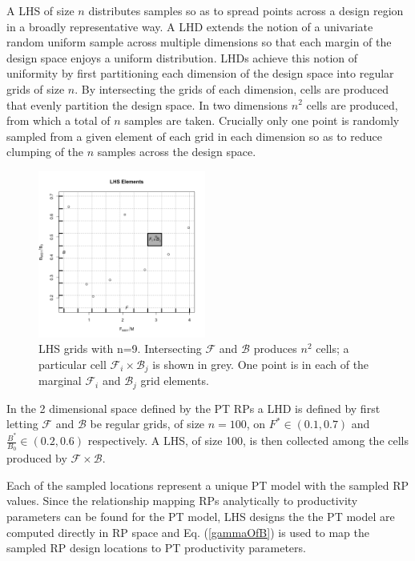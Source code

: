 A LHS of size $n$ distributes samples so as to spread points across a design 
region in a broadly representative way. A LHD extends the notion of a 
univariate random uniform sample across multiple dimensions so that each 
margin of the design space enjoys a uniform distribution.
%
LHDs achieve this notion of uniformity by first partitioning each dimension
of the design space into regular grids of size $n$. By intersecting the grids
of each dimension, cells are produced that evenly partition the design space.
In two dimensions $n^2$ cells are produced, from which a total of $n$ samples
are taken. Crucially only one point is randomly sampled from a given element of
each grid in each dimension so as to reduce clumping of the $n$ samples across
the design space.

%
\begin{figure}
\vspace{-1cm}
\includegraphics[width=0.49\textwidth]{../gpBias/designGrid.png}
\vspace{-0.5cm}
\caption{ LHS grids with n=9. Intersecting $\mathcal{F}$ and $\mathcal{B}$ produces $n^2$
cells; a particular cell $\mathcal{F}_i\times\mathcal{B}_j$ is shown in grey.
One point is in each of the marginal $\mathcal{F}_i$ and $\mathcal{B}_j$ grid
elements. \label{LHS}
}
\end{figure}


%
In the 2 dimensional space defined by the PT RPs a LHD is defined by first
letting $\mathcal{F}$ and $\mathcal{B}$ be regular grids, of size $n=100$, on
\mbox{$F^*\in(0.1, 0.7)$} and \mbox{$\frac{B^*}{B_0}\in(0.2, 0.6)$}
respectively. A LHS, of size 100, is then collected among the cells produced 
by $\mathcal{F}\times\mathcal{B}$. 

%
Each of the sampled locations represent a unique PT model with the sampled RP 
values. Since the relationship mapping RPs analytically to productivity
parameters can be found for the PT model, LHS designs the the PT model are 
computed directly in RP space and Eq. (\ref{gammaOfB}) is used to map the
sampled RP design locations to PT productivity parameters.

